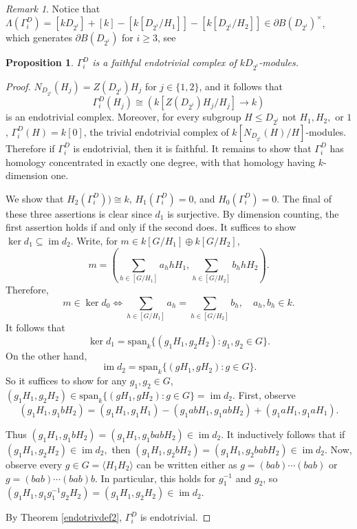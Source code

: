 \documentclass[10pt,letterpaper, boxed, cm]{amsart}
\newcommand{\inv}{^{-1}}
\newcommand{\im}{\operatorname{im}}
\newtheorem{prop}[theorem]{Proposition}
\theoremstyle{remark}
\newtheorem{remark}[theorem]{Remark}
\theoremstyle{definition}
\begin{document}
\begin{remark}
		Notice that $\Lambda(\Gamma^D_i) = [kD_{2^i}] + [k] - [k[D_{2^i}/H_1]] - [k[D_{2^i}/H_2]] \in \partial B(D_{2^i})^\times$, which generates $\partial B(D_{2^i})$ for $i \geq 3$, see \cite[Lemma 11.2.34]{Bou10}

	\end{remark}

	\begin{prop}
		$\Gamma_i^D$ is a faithful endotrivial complex of $kD_{2^i}$-modules.
	\end{prop}
	\begin{proof}
		$N_{D_{2^i}}(H_j) = Z(D_{2^i}) H_j$ for $j \in \{1,2\}$, and it follows that \[\Gamma^D_i(H_j) \cong (k[Z(D_{2^i}) H_j/H_j] \to k)\] is an endotrivial complex. Moreover, for every subgroup $H \leq D_{2^i}$ not $H_1, H_2,$ or $1$, $\Gamma^D_i(H) = k[0]$, the trivial endotrivial complex of $k[N_{D_{2^i}}(H)/H]$-modules. Therefore if $\Gamma^D_i$ is endotrivial, then it is faithful. It remains to show that $\Gamma^D_i$ has homology concentrated in exactly one degree, with that homology having $k$-dimension one.

        We show that $H_2(\Gamma^D_i)) \cong k$, $H_1(\Gamma^D_i) = 0$, and $H_{0}(\Gamma^D_i) = 0$. The final of these three assertions is clear since $d_1$ is surjective. By dimension counting, the first assertion holds if and only if the second does. It suffices to show $\ker d_1 \subseteq \im d_2$. Write, for $m \in k[G/H_1] \oplus k[G/H_2]$, \[m = \left(\sum_{h\in [G/H_1]} a_{h}h H_1, \sum_{h \in [G/H_2]} b_{h}hH_2\right).\] Therefore, \[m\in \ker d_0 \iff \sum_{h\in [G/H_1]} a_h = \sum_{h\in [G/H_2]} b_h, \quad a_h, b_h \in k.\]
		It follows that \[\ker d_1 = \text{span}_k \{(g_1H_1, g_2H_2): g_1,g_2 \in G\}.\] On the other hand, \[\im d_2 = \text{span}_k \{(gH_1, gH_2) : g\in G\}.\]
		So it suffices to show for any $g_1, g_2 \in G$, $(g_1H_1, g_2H_2) \in \text{span}_k\{(gH_1 ,gH_2): g\in G\} = \im d_2.$ First, observe
		\[(g_1H_1, g_1bH_2) = (g_1H_1, g_1H_1) - (g_1abH_1, g_1abH_2) + (g_1aH_1, g_1aH_1).\]

		Thus $(g_1H_1, g_1bH_2) = (g_1H_1, g_1babH_2) \in \im d_2$. It inductively follows that if $(g_1H_1, g_2H_2) \in \im d_2,$ then $(g_1H_1, g_2bH_2) = (g_1H_1, g_2babH_2) \in \im d_2$. Now, observe every $g \in G = \langle H_1H_2\rangle$ can be written either as $g = (bab)\cdots(bab)$ or $g = (bab)\cdots(bab)b$. In particular, this holds for $g_1\inv$ and $g_2$, so $(g_1H_1, g_1g_1\inv g_2H_2) = (g_1H_1, g_2H_2) \in \im d_2$.

        By Theorem \ref{endotrivdef2}, $\Gamma^D_i$ is endotrivial.
	\end{proof}
\end{document}
